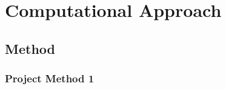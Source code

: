 \chapter{Computational Approach}

\section{Method}\label{sec:Method}

\subsection{Project Method 1}\label{sec:project method}

